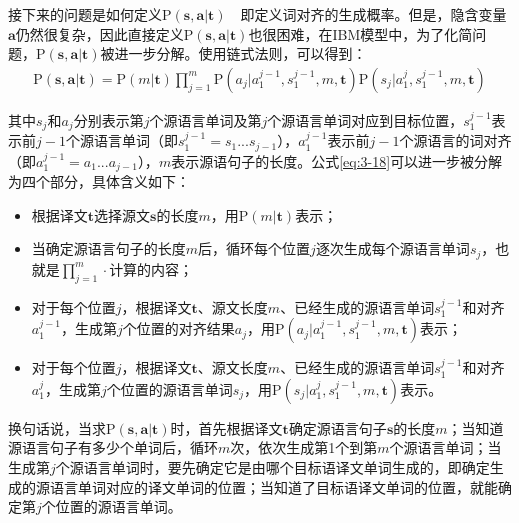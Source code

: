 \parinterval 接下来的问题是如何定义$\textrm{P}(\mathbf{s},\mathbf{a}|\mathbf{t})$\ \dash \ 即定义词对齐的生成概率。但是，隐含变量$\mathbf{a}$仍然很复杂，因此直接定义$\textrm{P}(\mathbf{s},\mathbf{a}|\mathbf{t})$也很困难，在IBM模型中，为了化简问题，$\textrm{P}(\mathbf{s},\mathbf{a}|\mathbf{t})$被进一步分解。使用链式法则，可以得到：
\begin{eqnarray}
\textrm{P}(\mathbf{s},\mathbf{a}|\mathbf{t})=\textrm{P}(m|\mathbf{t})\prod_{j=1}^{m}{\textrm{P}(a_j|a_1^{j-1},s_1^{j-1},m,\mathbf{t})\textrm{P}(s_j|a_1^{j},s_1^{j-1},m,\mathbf{t})}
\label{eq:3-18}
\end{eqnarray}

\noindent  其中$s_j$和$a_j$分别表示第$j$个源语言单词及第$j$个源语言单词对应到目标位置，$s_1^{j-1}$表示前$j-1$个源语言单词（即$s_1^{j-1}=s_1...s_{j-1}$），$a_1^{j-1}$表示前$j-1$个源语言的词对齐（即$a_1^{j-1}=a_1...a_{j-1}$），$m$表示源语句子的长度。公式\ref{eq:3-18}可以进一步被分解为四个部分，具体含义如下：

\begin{itemize}
\vspace{0.5em}
\item 根据译文$\mathbf{t}$选择源文$\mathbf{s}$的长度$m$，用$\textrm{P}(m|\mathbf{t})$表示；
\vspace{0.5em}
\item 当确定源语言句子的长度$m$后，循环每个位置$j$逐次生成每个源语言单词$s_j$，也就是$\prod_{j=1}^m \cdot$计算的内容；
\vspace{0.5em}
\item 对于每个位置$j$，根据译文$\mathbf{t}$、源文长度$m$、已经生成的源语言单词$s_1^{j-1}$和对齐$a_1^{j-1}$，生成第$j$个位置的对齐结果$a_j$，用$\textrm{P}(a_j|a_1^{j-1},s_1^{j-1},m,\mathbf{t})$表示；
\vspace{0.5em}
\item 对于每个位置$j$，根据译文$\mathbf{t}$、源文长度$m$、已经生成的源语言单词$s_1^{j-1}$和对齐$a_1^j$，生成第$j$个位置的源语言单词$s_j$，用$\textrm{P}(s_j|a_1^{j},s_1^{j-1},m,\mathbf{t})$表示。
\vspace{0.5em}
\end{itemize}
\parinterval 换句话说，当求$\textrm{P}(\mathbf{s},\mathbf{a}|\mathbf{t})$时，首先根据译文$\mathbf{t}$确定源语言句子$\mathbf{s}$的长度$m$；当知道源语言句子有多少个单词后，循环$m$次，依次生成第1个到第$m$个源语言单词；当生成第$j$个源语言单词时，要先确定它是由哪个目标语译文单词生成的，即确定生成的源语言单词对应的译文单词的位置；当知道了目标语译文单词的位置，就能确定第$j$个位置的源语言单词。

